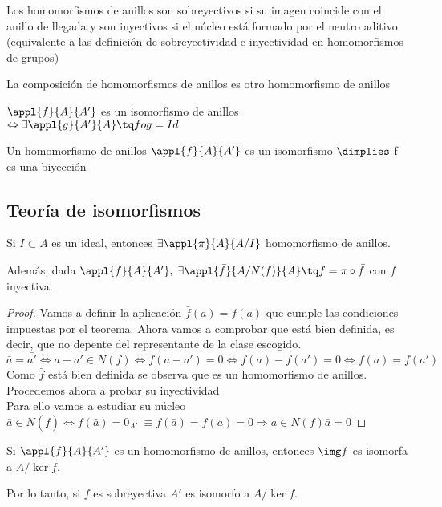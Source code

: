 \documentclass[nochap]{apuntes}
\begin{document}
Los homomorfismos de anillos son sobreyectivos si su imagen coincide con el anillo de llegada y son inyectivos si el núcleo está 
formado por el neutro aditivo (equivalente a las definición de sobreyectividad e inyectividad en homomorfismos de grupos)

\begin{lemma}
 La composición de homomorfismos de anillos es otro homomorfismo de anillos
\end{lemma}

\begin{defn}
 $\appl{f}{A}{A'}$  es un isomorfismo de anillos $\Leftrightarrow \exists \appl{g}{A'}{A} \tq fog = Id$
\end{defn}

\begin{lemma}
 Un homomorfismo de anillos $\appl{f}{A}{A'}$  es un isomorfismo $\dimplies$ f es una biyección
\end{lemma}

\subsection{Teoría de isomorfismos}
\begin{theorem}
Si $I \subset A$  es un ideal, entonces $\exists \appl{\pi}{A}{A/I}$ homomorfismo de anillos.

Además, dada  $\appl{f}{A}{A'},\; \exists \appl{\bar{f}}{A/N(f)}{A} \tq f=\pi \circ \bar{f}$ con $f$ inyectiva.
\end{theorem}
\begin{proof}
 Vamos a definir la aplicación $\bar{f}(\bar{a})=f(a)$  que cumple las condiciones impuestas por el teorema.
 Ahora vamos a comprobar que está bien definida, es decir, que no depente del representante de la clase escogido.\\
 $\bar{a}=\bar{a'} \Leftrightarrow a-a'\in N(f) \Leftrightarrow f(a-a')=0 \Leftrightarrow f(a)-f(a')=0 \Leftrightarrow f(a)=f(a')$\\
 Como $\bar{f}$  está bien definida se observa que es un homomorfismo de anillos. Procedemos ahora a probar su inyectividad\\
 Para ello vamos a estudiar su núcleo\\
 $\bar{a}\in N(\bar{f}) \Leftrightarrow \bar{f}(\bar{a})=0_{A'} \ \equiv \bar{f}(\bar{a})=f(a)=0 \Rightarrow a \in N(f) \bar{a}=\bar{0}$
\end{proof}

\begin{theorem} \label{thmIsoAnillos2}
 Si  $\appl{f}{A}{A'}$  es un homomorfismo de anillos, entonces $\img f$ es isomorfa a $A/\ker f$.
 
 Por lo tanto, si $f$ es sobreyectiva $A'$ es isomorfo a $A/\ker f$.
\end{theorem}
\end{document}
